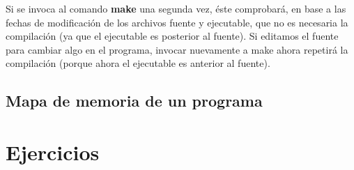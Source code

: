 Si se invoca al comando \textbf{make} una segunda vez, éste comprobará, en base a las fechas de
modificación de los archivos fuente y ejecutable, que no es necesaria la compilación (ya que el
ejecutable es posterior al fuente). Si editamos el fuente para cambiar algo en el programa, invocar
nuevamente a make ahora repetirá la compilación (porque ahora el ejecutable es anterior al fuente).

\subsection{Mapa de memoria de un programa}


\section{Ejercicios}
